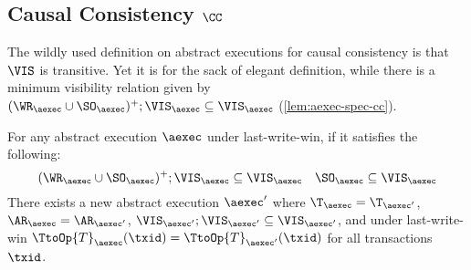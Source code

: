 \subsection{Causal Consistency \( \CC \)}
\label{sec:sound-complete-cc}

The wildly used definition on abstract executions for causal consistency is that \( \VIS \) is transitive.
Yet it is for the sack of elegant definition, while there is a minimum visibility relation given by \( (\WR_\aexec \cup \SO_\aexec)^{+} ; \VIS_\aexec \subseteq \VIS_\aexec \) (\cref{lem:aexec-spec-cc}).

\begin{lemma}
    \label{lem:aexec-spec-cc}
    For any abstract execution \( \aexec \) under last-write-win, if it satisfies the following:
    \[
        (\WR_\aexec \cup \SO_\aexec)^{+} ; \VIS_\aexec \subseteq \VIS_\aexec \quad \SO_\aexec \subseteq \VIS_\aexec
    \]
    There exists a new abstract execution \( \aexec' \) where \( \T_\aexec = \T_{\aexec'} \), \( \AR_\aexec = \AR_{\aexec'} \),
    \( \VIS_{\aexec'} ; \VIS_{\aexec'} \subseteq \VIS_{\aexec'} \), and
    under last-write-win \( \TtoOp{T}_{\aexec}(\txid) = \TtoOp{T}_{\aexec'}(\txid) \) for all transactions \( \txid \).
\end{lemma}
